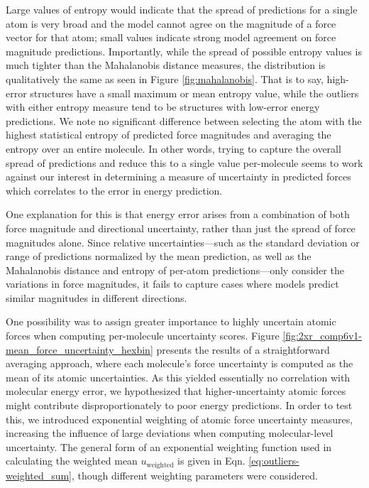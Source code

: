 Large values of entropy would indicate that the spread of predictions for a single atom is very broad and the model cannot agree on the magnitude of a force vector for that atom; small values indicate strong model agreement on force magnitude predictions.
Importantly, while the spread of possible entropy values is much tighter than the Mahalanobis distance measures, the distribution is qualitatively the same as seen in Figure \ref{fig:mahalanobis}.
That is to say, high-error structures have a small maximum or mean entropy value, while the outliers with either entropy measure tend to be structures with low-error energy predictions. 
We note no significant difference between selecting the atom with the highest statistical entropy of predicted force magnitudes and averaging the entropy over an entire molecule. 
In other words, trying to capture the overall spread of predictions and reduce this to a single value per-molecule seems to work against our interest in determining a measure of uncertainty in predicted forces which correlates to the error in energy prediction.

One explanation for this is that energy error arises from a combination of both force magnitude and directional uncertainty, rather than just the spread of force magnitudes alone.
Since relative uncertainties---such as the standard deviation or range of predictions normalized by the mean prediction, as well as the Mahalanobis distance and entropy of per-atom predictions---only consider the variations in force magnitudes, it fails to capture cases where models predict similar magnitudes in different directions.


One possibility was to assign greater importance to highly uncertain atomic forces when computing per-molecule uncertainty scores. 
Figure \ref{fig:2xr_comp6v1-mean_force_uncertainty_hexbin} presents the results of a straightforward averaging approach, where each molecule's force uncertainty is computed as the mean of its atomic uncertainties. 
As this yielded essentially no correlation with molecular energy error, we hypothesized that higher-uncertainty atomic forces might contribute disproportionately to poor energy predictions.
In order to test this, we introduced exponential weighting of atomic force uncertainty measures, increasing the influence of large deviations when computing molecular-level uncertainty. 
The general form of an exponential weighting function used in calculating the weighted mean $u_{\text{weighted}}$ is given in Eqn. \ref{eq:outliers-weighted_sum}, though different weighting parameters were considered.

